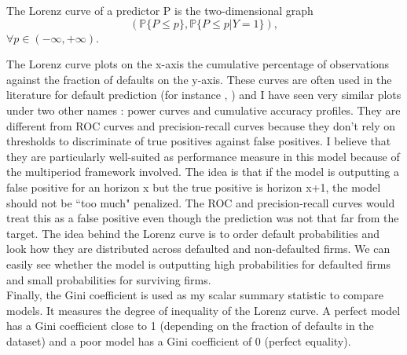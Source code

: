 
\begin{definition}
The Lorenz curve of a predictor P is the two-dimensional graph
\begin{equation*}
    (\mathbb{P}\{P \leq p\},\mathbb{P}\{P\leq p | Y = 1\}),
\end{equation*}
$\forall p \in (-\infty,+\infty)$.
\end{definition}

The Lorenz curve plots on the x-axis the cumulative percentage of observations against the fraction of defaults on the y-axis.
These curves are often used in the literature for default prediction (for instance \citet{leippold}, \citet{Duan2012}) and I have seen very similar plots under two other names : power curves and cumulative accuracy profiles. They are different from ROC curves and precision-recall curves because they don't rely on thresholds to discriminate of true positives against false positives. I believe that they are particularly well-suited as performance measure in this model because of the multiperiod framework involved. The idea is that if the model is outputting a false positive for an horizon x but the true positive is horizon x+1, the model should not be ``too much" penalized. The ROC and precision-recall curves would treat this as a false positive even though the prediction was not that far from the target. The idea behind the Lorenz curve is to order default probabilities and look how they are distributed across defaulted and non-defaulted firms. We can easily see whether the model is outputting high probabilities for defaulted firms and small probabilities for surviving firms. \\
Finally, the Gini coefficient is used as my scalar summary statistic to compare models. It measures the degree of inequality of the Lorenz curve. A perfect model has a Gini coefficient close to 1 (depending on the fraction of defaults in the dataset) and a poor model has a Gini coefficient of 0 (perfect equality).

